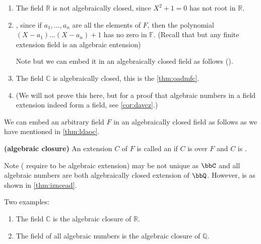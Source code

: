 \documentclass{article}
\newcommand{\bfs}[1]{\textbf{({#1}) }}
\begin{document}
\begin{exma}
\begin{enumerate}
    \item The field $\mathbb{R}$ is not algebraically closed, since $X^{2}+1=0$ has not root in $\mathbb{R}$.
    \item {}, since if $a_{1}, \ldots, a_{n}$ are all the elements of $F$, then the polynomial $\left(X-a_{1}\right) \ldots\left(X-a_{n}\right)+1$ has no zero in $\mathbb{F}$. (Recall that but any finite extension field is an algebraic entension)
    
    Note but we can embed it in an algebraically closed field as follows ().
    \item  The field $\mathbb{C}$ is algebraically closed, this is the  \cref{thm:oadmfc}.
    \item {} (We will not prove this here, but for a proof that algebraic numbers in a field extension indeed form a field, see \cref{cor:davcz}.)
\end{enumerate}
\end{exma}

We can embed an arbitrary field $F$ in an algebraically closed field as follows as we have mentioned in \cref{thm:ldaoc}.


\begin{defa}\bfs{algebraic closure}\label{def:dvsft}
 An extension $C$ of $F$ is called an  if $C$ is  over $F$ and $C$ is .
\end{defa} 
\begin{rema}
Note  ( require to be algebraic extension) may be not unique as $\bbC$ and all algebraic numbers are both algebraically closed extension of $\bbQ$. However,  is  as shown in \cref{thm:izncead}.
\end{rema}

\begin{exma}Two examples:
\begin{enumerate}
    \item The field $\mathbb{C}$ is the algebraic closure of $\mathbb{R}$.
    \item The field of all algebraic numbers is the algebraic closure of $\mathbb{Q}$.
\end{enumerate}

\end{exma}
\end{document}
